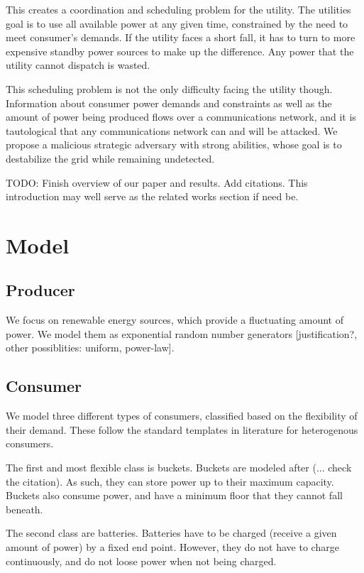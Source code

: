 \documentclass[conference]{IEEEtran}
\begin{document}
This creates a coordination and scheduling problem for the utility.  The utilities goal is to use all available power at any
given time, constrained by the need to meet consumer's demands.  If the utility faces a short fall, it has to turn to more 
expensive standby power sources to make up the difference.  Any power that the utility cannot dispatch is wasted.

This scheduling problem is not the only difficulty facing the utility though.  Information about consumer power demands and 
constraints as well as the amount of power being produced flows over a communications network, and it is tautological that 
any communications network can and will be attacked.  We propose a malicious strategic adversary with strong abilities, whose
goal is to destabilize the grid while remaining undetected. 

TODO: Finish overview of our paper and results.  Add citations.  This introduction may well serve as the related works 
section if need be.

\section{Model}

\subsection{Producer}

We focus on renewable energy sources, which provide a fluctuating amount of power.  We model them as exponential random 
number generators [justification?, other possiblities: uniform, power-law].

\subsection{Consumer}

We model three different types of consumers, classified based on the flexibility of their demand.  These follow the standard
templates in literature for heterogenous consumers.

The first and most flexible class is buckets.  Buckets are modeled after (... check the citation).  As such, they can store
power up to their maximum capacity.  Buckets also consume power, and have a minimum floor that they cannot fall beneath.

The second class are batteries.  Batteries have to be charged (receive a given amount of power) by a fixed end point.  However,
they do not have to charge continuously, and do not loose power when not being charged.
\end{document}
